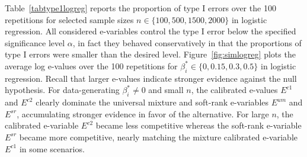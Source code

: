 \documentclass[pdflatex,sn-mathphys-num]{sn-jnl}%
\theoremstyle{thmstyleone}%
\theoremstyle{thmstyletwo}%
\theoremstyle{thmstylethree}%
\newcommand{\david}[1]{{\small{\color{blue} \sf $\heartsuit$ [David: #1]}}}
\begin{document}
Table~\ref{tabtype1logreg} reports the proportion of type I errors over the 100 repetitions for selected sample sizes $n \in \{100, 500, 1500, 2000\}$ in logistic regression. All considered e-variables control the type I error below the specified significance level $\alpha$, in fact they behaved conservatively in that the proportions of type I errors were smaller than the desired level. Figure~\ref{fig:simlogreg} plots the average log e-values over the 100 repetitions for $\beta_i^*\in \{0, 0.15, 0.3, 0.5\}$ in logistic regression. Recall that larger e-values indicate stronger evidence against the null hypothesis. For data-generating $\beta_i^* \neq 0$ and small $n$, the calibrated e-values $E^{c1}$ and $E^{c2}$ clearly dominate the universal mixture and soft-rank e-variables $E^{um}$ and $E^{sr}$, accumulating stronger evidence in favor of the alternative. For large $n$, the calibrated e-variable $E^{c2}$ became less competitive whereas the soft-rank e-variable $E^{sr}$ became more competitive, nearly matching the mixture calibrated e-variable $E^{c1}$ in some scenarios. 
\end{document}
